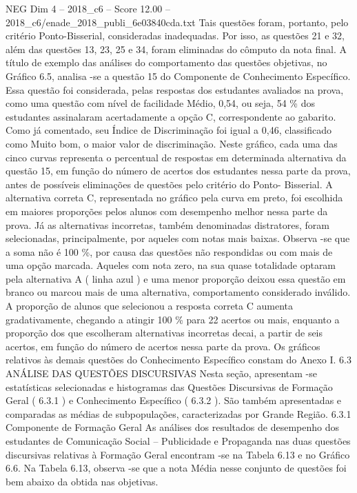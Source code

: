\begin{textsample}{NEG Dim 4 – 2018\_c6 – Score 12.00 – 2018\_c6/enade\_2018\_publi\_6e03840cda.txt}
Tais questões foram, portanto, pelo critério Ponto-Bisserial, consideradas inadequadas.
Por isso, as questões 21 e 32, além das questões 13, 23, 25 e 34, foram eliminadas do cômputo da nota final.
A título de exemplo das análises do comportamento das questões objetivas, no Gráfico 6.5, analisa -se a questão 15 do Componente de Conhecimento Específico.
Essa questão foi considerada, pelas respostas dos estudantes avaliados na prova, como uma questão com nível de facilidade Médio, 0,54, ou seja, 54 \% dos estudantes assinalaram acertadamente a opção C, correspondente ao gabarito.
Como já comentado, seu Índice de Discriminação foi igual a 0,46, classificado como Muito bom, o maior valor de discriminação.
Neste gráfico, cada uma das cinco curvas representa o percentual de respostas em determinada alternativa da questão 15, em função do número de acertos dos estudantes nessa parte da prova, antes de possíveis eliminações de questões pelo critério do Ponto- Bisserial.
A alternativa correta C, representada no gráfico pela curva em preto, foi escolhida em maiores proporções pelos alunos com desempenho melhor nessa parte da prova.
Já as alternativas incorretas, também denominadas distratores, foram selecionadas, principalmente, por aqueles com notas mais baixas.
Observa -se que a soma não é 100 \%, por causa das questões não respondidas ou com mais de uma opção marcada.
Aqueles com nota zero, na sua quase totalidade optaram pela alternativa A ( linha azul ) e uma menor proporção deixou essa questão em branco ou marcou mais de uma alternativa, comportamento considerado inválido.
A proporção de alunos que selecionou a resposta correta C aumenta gradativamente, chegando a atingir 100 \% para 22 acertos ou mais, enquanto a proporção dos que escolheram alternativas incorretas decai, a partir de seis acertos, em função do número de acertos nessa parte da prova.
Os gráficos relativos às demais questões do Conhecimento Específico constam do Anexo I. 6.3 ANÁLISE DAS QUESTÕES DISCURSIVAS Nesta seção, apresentam -se estatísticas selecionadas e histogramas das Questões Discursivas de Formação Geral ( 6.3.1 ) e Conhecimento Específico ( 6.3.2 ).
São também apresentadas e comparadas as médias de subpopulações, caracterizadas por Grande Região. 6.3.1 Componente de Formação Geral As análises dos resultados de desempenho dos estudantes de Comunicação Social – Publicidade e Propaganda nas duas questões discursivas relativas à Formação Geral encontram -se na Tabela 6.13 e no Gráfico 6.6.
Na Tabela 6.13, observa -se que a nota Média nesse conjunto de questões foi bem abaixo da obtida nas objetivas.

\end{textsample}
